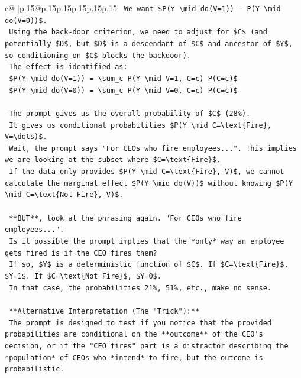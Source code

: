 \documentclass{article}
\begin{document}
{\begin{supertabular}{c@{$\;$}|p{.15\linewidth}@{}p{.15\linewidth}p{.15\linewidth}p{.15\linewidth}p{.15\linewidth}p{.15\linewidth}}
{{{\texttt{    We want \$P(Y \textbackslash{}mid do(V=1)) {-} P(Y \textbackslash{}mid do(V=0))\$.} \\
\texttt{    Using the back{-}door criterion, we need to adjust for \$C\$ (and potentially \$D\$, but \$D\$ is a descendant of \$C\$ and ancestor of \$Y\$, so conditioning on \$C\$ blocks the backdoor).} \\
\texttt{    The effect is identified as:} \\
\texttt{    \$P(Y \textbackslash{}mid do(V=1)) = \textbackslash{}sum\_c P(Y \textbackslash{}mid V=1, C=c) P(C=c)\$} \\
\texttt{    \$P(Y \textbackslash{}mid do(V=0)) = \textbackslash{}sum\_c P(Y \textbackslash{}mid V=0, C=c) P(C=c)\$} \\
\\ 
\texttt{    The prompt gives us the overall probability of \$C\$ (28\%).} \\
\texttt{    It gives us conditional probabilities \$P(Y \textbackslash{}mid C=\textbackslash{}text\{Fire\}, V=\textbackslash{}dots)\$.} \\
\texttt{    Wait, the prompt says "For CEOs who fire employees...". This implies we are looking at the subset where \$C=\textbackslash{}text\{Fire\}\$.} \\
\texttt{    If the data only provides \$P(Y \textbackslash{}mid C=\textbackslash{}text\{Fire\}, V)\$, we cannot calculate the marginal effect \$P(Y \textbackslash{}mid do(V))\$ without knowing \$P(Y \textbackslash{}mid C=\textbackslash{}text\{Not Fire\}, V)\$.} \\
\\ 
\texttt{    **BUT**, look at the phrasing again. "For CEOs who fire employees...".} \\
\texttt{    Is it possible the prompt implies that the *only* way an employee gets fired is if the CEO fires them?} \\
\texttt{    If so, \$Y\$ is a deterministic function of \$C\$. If \$C=\textbackslash{}text\{Fire\}\$, \$Y=1\$. If \$C=\textbackslash{}text\{Not Fire\}\$, \$Y=0\$.} \\
\texttt{    In that case, the probabilities 21\%, 51\%, etc., make no sense.} \\
\\ 
\texttt{    **Alternative Interpretation (The "Trick"):**} \\
\texttt{    The prompt is designed to test if you notice that the provided probabilities are conditional on the **outcome** of the CEO's decision, or if the "CEO fires" part is a distractor describing the *population* of CEOs who *intend* to fire, but the outcome is probabilistic.} \\
}}}
\end{supertabular}}
\end{document}
